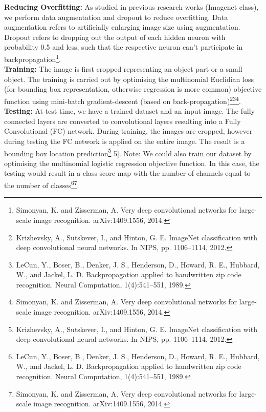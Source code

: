 \documentclass[8pt,a4]{article}
\begin{document}
\begin{itemize}
	\textbf{Reducing Overfitting:} As studied in previous research works (Imagenet class), we perform data augmentation and dropout to reduce overfitting. Data augmentation refers to artificially enlarging image size using augmentation. Dropout refers to dropping out the output of each hidden neuron with probability 0.5 and less, such that the respective neuron can't participate in backpropagation\footnote{Simonyan, K. and Zisserman, A. Very deep convolutional networks for large-scale image recognition. arXiv:1409.1556, 2014.
	}. 
	\\\textbf{Training:} The image is first cropped representing an object part or a small object. The training is carried out by optimising the multinomial Euclidian loss (for bounding box representation, otherwise regression is more common) objective function using mini-batch gradient-descent (based on back-propagation)\footnote{Krizhevsky, A., Sutskever, I., and Hinton, G. E. ImageNet classification with deep convolutional neural networks. In NIPS, pp. 1106–1114, 2012.}\footnote{LeCun, Y., Boser, B., Denker, J. S., Henderson, D., Howard, R. E., Hubbard, W., and Jackel, L. D. Backpropagation applied to handwritten zip code recognition. Neural Computation, 1(4):541–551, 1989.
	}\footnote{Simonyan, K. and Zisserman, A. Very deep convolutional networks for large-scale image recognition. arXiv:1409.1556, 2014.}. 
	\\\textbf{Testing:} At test time, we have a trained dataset and an input image. The fully connected layers are converted to convolutional layers resulting into a Fully Convolutional (FC) network. During training, the images are cropped, however during testing the FC network is applied on the entire image. The result is a bounding box location prediction\footnote{Krizhevsky, A., Sutskever, I., and Hinton, G. E. ImageNet classification with deep convolutional neural networks. In NIPS, pp. 1106–1114, 2012.} 5].
	Note: We could also train our dataset by optimising the multinomial logistic regression objective function. In this case, the testing would result in a class score map with the number of channels equal to the number of classes\footnote{LeCun, Y., Boser, B., Denker, J. S., Henderson, D., Howard, R. E., Hubbard, W., and Jackel, L. D. Backpropagation applied to handwritten zip code recognition. Neural Computation, 1(4):541–551, 1989.}\footnote{Simonyan, K. and Zisserman, A. Very deep convolutional networks for large-scale image recognition. arXiv:1409.1556, 2014.}.

\end{itemize}
\end{document}
